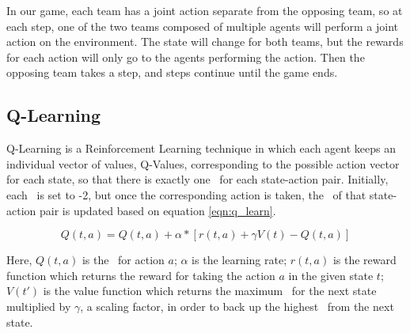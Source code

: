 In our game, each team has a joint action separate from the opposing team, so at each step, one of the two teams composed of multiple agents will perform a joint action on the environment. The state will change for both teams, but the rewards for each action will only go to the agents performing the action. Then the opposing team takes a step, and steps continue until the game ends.
 
 
 
\subsection{Q-Learning}\label{QL}
Q-Learning is a Reinforcement Learning technique in which each agent keeps an individual vector of values, Q-Values, corresponding to the possible action vector for each state, so that there is exactly one \qVal\ for each state-action pair. Initially, each \qVal\ is set to -2, but once the corresponding action is taken, the \qVal\ of that state-action pair is updated based on equation \ref{eqn:q_learn}.

\vspace{- 0.5 cm}

\begin{equation}\label{eqn:q_learn}
Q(t,a) = Q(t,a) + \alpha * [r(t,a) + \gamma V(t) - Q(t,a)]
\end{equation}



Here, $Q(t, a)$ is the \qVal\ for action $a$;  $\alpha$  is the learning rate; $r(t, a)$ is the reward function which returns the reward for taking the action $a$ in the given state $t$; $V(t')$ is the value function which returns the maximum \qVal\ for the next state multiplied by $\gamma$, a scaling factor, in order to back up the highest \qVal\ from the next state.




